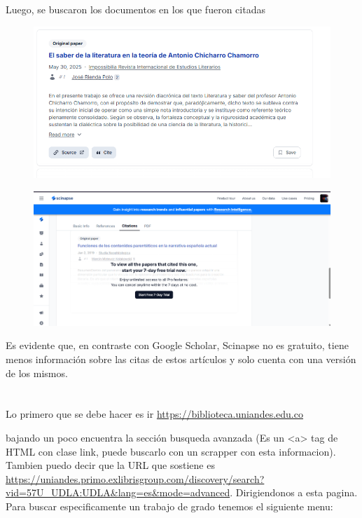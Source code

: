 \documentclass[12pt]{exam}
\begin{document}
Luego, se buscaron los documentos en los que fueron citadas
\begin{figure}[H]
    \centering
    \includegraphics[width=0.8\linewidth]{scinapsis citas.png}
    \label{}
\end{figure}
\begin{figure}[H]
    \centering
    \includegraphics[width=0.8\linewidth]{scinapsis citas 2.png}
    \label{}
\end{figure}

Es evidente que, en contraste con Google Scholar, Scinapse no es gratuito, tiene menos información sobre las citas de estos artículos y solo cuenta con una versión de los mismos.


\section{}
\subsection{}

Lo primero que se debe hacer es ir \url{https://biblioteca.uniandes.edu.co}

bajando un poco encuentra la sección busqueda avanzada (Es un <a> tag de HTML con clase link, puede buscarlo con un scrapper con esta informacion). Tambien puedo decir que la URL que sostiene es \url{https://uniandes.primo.exlibrisgroup.com/discovery/search?vid=57U_UDLA:UDLA&lang=es&mode=advanced}. Dirigiendonos a esta pagina. Para buscar especificamente un trabajo de grado tenemos el siguiente menu:
\end{document}
